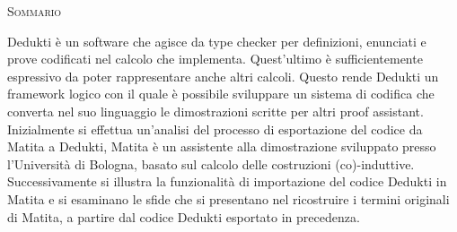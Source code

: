 \documentclass[12pt,a4paper]{mimosis}
\begin{document}
\begin{center}
  \textsc{Sommario}
\end{center}

Dedukti è un software che agisce da type checker per definizioni, enunciati e prove
codificati nel calcolo che implementa. Quest'ultimo è sufficientemente espressivo da poter
rappresentare anche altri calcoli. Questo rende Dedukti un framework logico con il 
quale è possibile sviluppare un sistema di codifica che converta nel suo linguaggio
le dimostrazioni scritte per altri proof assistant. 
Inizialmente si effettua un'analisi del processo di esportazione del codice da Matita
a Dedukti, Matita è un assistente alla dimostrazione sviluppato presso l'Università di
Bologna, basato sul calcolo delle costruzioni (co)-induttive. Successivamente si illustra 
la funzionalità di importazione del codice Dedukti in Matita e si esaminano le sfide che
si presentano nel ricostruire i termini originali di Matita, a partire dal codice Dedukti 
esportato in precedenza.


\thispagestyle{empty}
\tableofcontents
\end{document}
